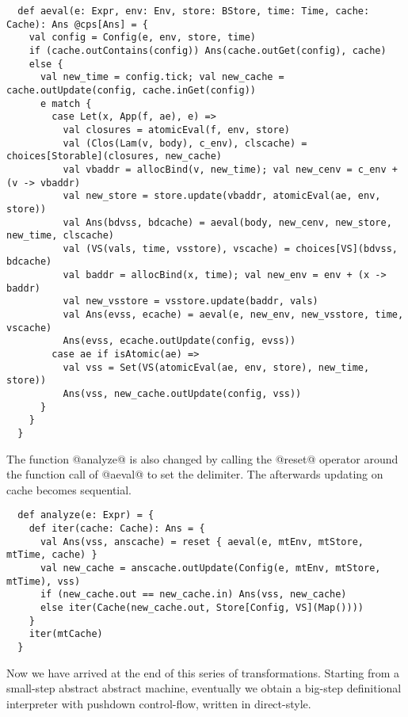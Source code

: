 \documentclass[acmsmall, review]{acmart}\settopmatter{}
\begin{document}
\begin{lstlisting}
  def aeval(e: Expr, env: Env, store: BStore, time: Time, cache: Cache): Ans @cps[Ans] = {
    val config = Config(e, env, store, time)
    if (cache.outContains(config)) Ans(cache.outGet(config), cache)
    else {
      val new_time = config.tick; val new_cache = cache.outUpdate(config, cache.inGet(config))
      e match {
        case Let(x, App(f, ae), e) =>
          val closures = atomicEval(f, env, store)
          val (Clos(Lam(v, body), c_env), clscache) = choices[Storable](closures, new_cache)
          val vbaddr = allocBind(v, new_time); val new_cenv = c_env + (v -> vbaddr)
          val new_store = store.update(vbaddr, atomicEval(ae, env, store))
          val Ans(bdvss, bdcache) = aeval(body, new_cenv, new_store, new_time, clscache)
          val (VS(vals, time, vsstore), vscache) = choices[VS](bdvss, bdcache)
          val baddr = allocBind(x, time); val new_env = env + (x -> baddr)
          val new_vsstore = vsstore.update(baddr, vals)
          val Ans(evss, ecache) = aeval(e, new_env, new_vsstore, time, vscache)
          Ans(evss, ecache.outUpdate(config, evss))
        case ae if isAtomic(ae) =>
          val vss = Set(VS(atomicEval(ae, env, store), new_time, store))
          Ans(vss, new_cache.outUpdate(config, vss))
      }
    }
  }
\end{lstlisting}

The function @analyze@ is also changed by calling the @reset@ operator around the function 
call of @aeval@ to set the delimiter. The afterwards updating on cache becomes sequential.

\begin{lstlisting}
  def analyze(e: Expr) = {
    def iter(cache: Cache): Ans = {
      val Ans(vss, anscache) = reset { aeval(e, mtEnv, mtStore, mtTime, cache) }
      val new_cache = anscache.outUpdate(Config(e, mtEnv, mtStore, mtTime), vss)
      if (new_cache.out == new_cache.in) Ans(vss, new_cache)
      else iter(Cache(new_cache.out, Store[Config, VS](Map())))
    }
    iter(mtCache)
  }
\end{lstlisting}

Now we have arrived at the end of this series of transformations. Starting from a
small-step abstract abstract machine, eventually we obtain a big-step definitional
interpreter with pushdown control-flow, written in direct-style.

\end{document}
